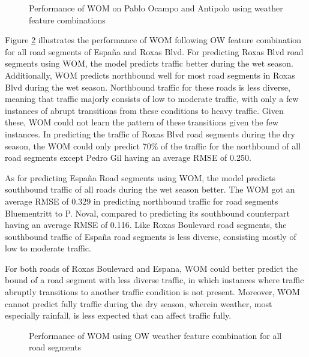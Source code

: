 \begin{figure}[h]
  \centering
  \captionsetup{justification=centering}
  \caption{Performance of WOM on Pablo Ocampo and Antipolo using weather feature combinations}
  \label{fig:wom_diff_feat_combi}
\end{figure}


Figure \ref{fig:wom_feat_combi_roads} illustrates the performance of WOM following OW feature combination for all road segments of España and Roxas Blvd. For predicting Roxas Blvd road segments using WOM, the model predicts traffic better during the wet season. Additionally, WOM predicts northbound well for most road segments in Roxas Blvd during the wet season. Northbound traffic for these roads is less diverse, meaning that traffic majorly consists of low to moderate traffic, with only a few instances of abrupt transitions from these conditions to heavy traffic. Given these, WOM could not learn the pattern of these transitions given the few instances. In predicting the traffic of Roxas Blvd road segments during the dry season, the WOM could only predict 70\% of the traffic for the northbound of all road segments except Pedro Gil having an average RMSE of 0.250. 

As for predicting España Road segments using WOM, the model predicts southbound traffic of all roads during the wet season better. The WOM got an average RMSE of 0.329 in predicting northbound traffic for road segments Bluementritt to P. Noval, compared to predicting its southbound counterpart having an average RMSE of 0.116. Like Roxas Boulevard road segments, the southbound traffic of España road segments is less diverse, consisting mostly of low to moderate traffic.

For both roads of Roxas Boulevard and Espana, WOM could better predict the bound of a road segment with less diverse traffic, in which instances where traffic abruptly transitions to another traffic condition is not present. Moreover, WOM cannot predict fully traffic during the dry season, wherein weather, most especially rainfall, is less expected that can affect traffic fully. 


\begin{figure}[h]
  \centering
  \captionsetup{justification=centering}
  \caption{Performance of WOM using OW weather feature combination for all road segments}
  \label{fig:wom_feat_combi_roads}
\end{figure}

